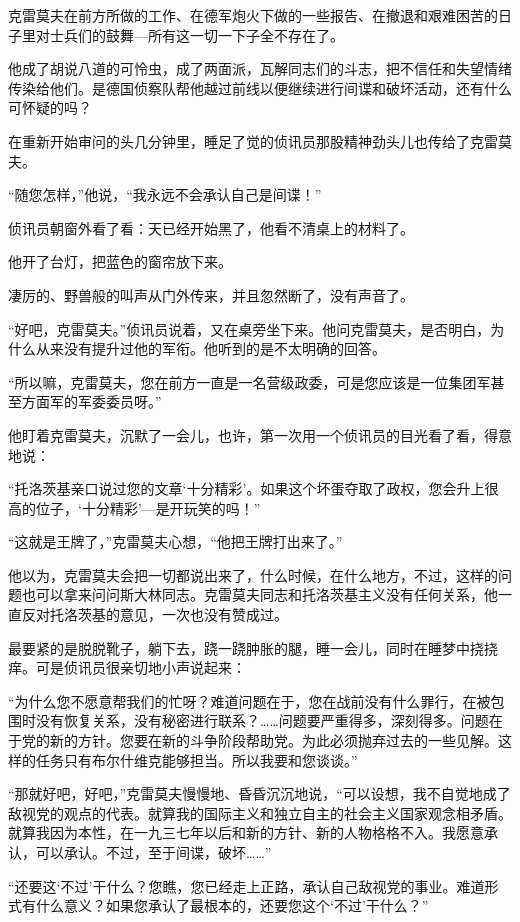 克雷莫夫在前方所做的工作、在德军炮火下做的一些报告、在撤退和艰难困苦的日子里对士兵们的鼓舞—所有这一切一下子全不存在了。

他成了胡说八道的可怜虫，成了两面派，瓦解同志们的斗志，把不信任和失望情绪传染给他们。是德国侦察队帮他越过前线以便继续进行间谍和破坏活动，还有什么可怀疑的吗？

在重新开始审问的头几分钟里，睡足了觉的侦讯员那股精神劲头儿也传给了克雷莫夫。

“随您怎样，”他说，“我永远不会承认自己是间谍！”

侦讯员朝窗外看了看：天已经开始黑了，他看不清桌上的材料了。

他开了台灯，把蓝色的窗帘放下来。

凄厉的、野兽般的叫声从门外传来，并且忽然断了，没有声音了。

“好吧，克雷莫夫。”侦讯员说着，又在桌旁坐下来。他问克雷莫夫，是否明白，为什么从来没有提升过他的军衔。他听到的是不太明确的回答。

“所以嘛，克雷莫夫，您在前方一直是一名营级政委，可是您应该是一位集团军甚至方面军的军委委员呀。”

他盯着克雷莫夫，沉默了一会儿，也许，第一次用一个侦讯员的目光看了看，得意地说：

“托洛茨基亲口说过您的文章‘十分精彩’。如果这个坏蛋夺取了政权，您会升上很高的位子，‘十分精彩’—是开玩笑的吗！”

“这就是王牌了，”克雷莫夫心想，“他把王牌打出来了。”

他以为，克雷莫夫会把一切都说出来了，什么时候，在什么地方，不过，这样的问题也可以拿来问问斯大林同志。克雷莫夫同志和托洛茨基主义没有任何关系，他一直反对托洛茨基的意见，一次也没有赞成过。

最要紧的是脱脱靴子，躺下去，跷一跷肿胀的腿，睡一会儿，同时在睡梦中挠挠痒。可是侦讯员很亲切地小声说起来：

“为什么您不愿意帮我们的忙呀？难道问题在于，您在战前没有什么罪行，在被包围时没有恢复关系，没有秘密进行联系？……问题要严重得多，深刻得多。问题在于党的新的方针。您要在新的斗争阶段帮助党。为此必须抛弃过去的一些见解。这样的任务只有布尔什维克能够担当。所以我要和您谈谈。”

“那就好吧，好吧，”克雷莫夫慢慢地、昏昏沉沉地说，“可以设想，我不自觉地成了敌视党的观点的代表。就算我的国际主义和独立自主的社会主义国家观念相矛盾。就算我因为本性，在一九三七年以后和新的方针、新的人物格格不入。我愿意承认，可以承认。不过，至于间谍，破坏……”

“还要这‘不过’干什么？您瞧，您已经走上正路，承认自己敌视党的事业。难道形式有什么意义？如果您承认了最根本的，还要您这个‘不过’干什么？”

